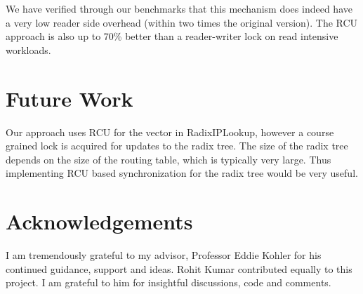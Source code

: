 \documentclass[a4paper,marginparwidth=50pt,marginparsep=10pt]{article}
\begin{document}
We have verified through our benchmarks that
this mechanism does indeed have a very low reader side overhead
(within two times the original version). The RCU approach is also up to
70\% better than a reader-writer lock on read intensive workloads.

\section{Future Work}


Our approach uses RCU for the vector in RadixIPLookup, however a course grained lock is acquired for updates to the radix tree. The size of the radix tree depends on the size of the routing table, which is typically very large. Thus implementing RCU based synchronization for the radix tree would be very useful.
\section{Acknowledgements}
I am tremendously grateful to my advisor, Professor Eddie Kohler for his continued guidance, support and ideas.
Rohit Kumar contributed equally to this project. I am grateful to him for insightful discussions, code and comments.


\end{document}
